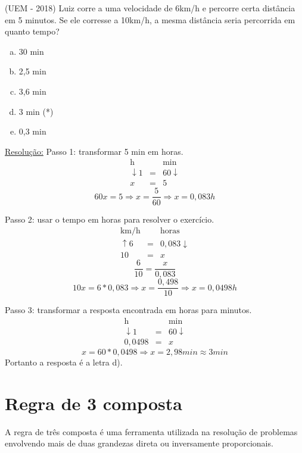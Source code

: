 \begin{exem}
 (UEM - 2018) Luiz corre a uma velocidade de 6km/h e percorre certa distância em 5 minutos. Se ele corresse a 10km/h, a mesma distância seria percorrida em quanto tempo?
 \begin{enumerate}[a)]
  \item 30 min
  \item 2,5 min
  \item 3,6 min
  \item 3 min (*)
  \item 0,3 min
 \end{enumerate}

 \underline{Resolução:}
 Passo 1: transformar 5 min em horas.
  \begin{eqnarray*}
   \text{h} & & \text{min} \\
    \downarrow 1 & = & 60 \downarrow \\
   x & = & 5
  \end{eqnarray*}
  \[60x=5 \Rightarrow x=\frac{5}{60} \Rightarrow x= 0,083 h\]

 Passo 2: usar o tempo em horas para resolver o exercício.
   \begin{eqnarray*}
   \text{km/h} & & \text{horas} \\
   \uparrow 6 & = & 0,083 \downarrow \\
   10 & = & x
  \end{eqnarray*}
  \[\frac{6}{10}=\frac{x}{0,083}\]
  \[10x=6*0,083 \Rightarrow x=\frac{0,498}{10} \Rightarrow x= 0,0498 h\]

 Passo 3: transformar a resposta encontrada em horas para minutos.
  \begin{eqnarray*}
   \text{h} & & \text{min} \\
    \downarrow 1 & = & 60 \downarrow \\
   0,0498 & = & x
  \end{eqnarray*}
  \[x= 60* 0,0498 \Rightarrow x= 2,98 min \approx 3 min\]
  Portanto a resposta é a letra d).

\end{exem}


\section{Regra de 3 composta}

A regra de três composta é uma ferramenta utilizada na resolução de problemas envolvendo mais de duas grandezas direta ou inversamente proporcionais.

